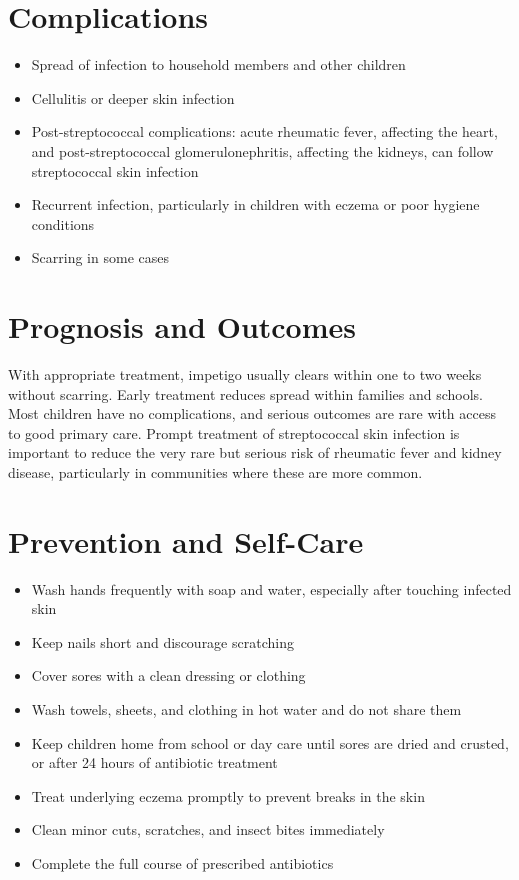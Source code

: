 \section*{Complications}
\begin{itemize}
    \item Spread of infection to household members and other children
    \item Cellulitis or deeper skin infection
    \item Post-streptococcal complications: acute rheumatic fever, affecting the heart, and post-streptococcal glomerulonephritis, affecting the kidneys, can follow streptococcal skin infection
    \item Recurrent infection, particularly in children with eczema or poor hygiene conditions
    \item Scarring in some cases
\end{itemize}

\section*{Prognosis and Outcomes}
With appropriate treatment, impetigo usually clears within one to two weeks without scarring. Early treatment reduces spread within families and schools. Most children have no complications, and serious outcomes are rare with access to good primary care. Prompt treatment of streptococcal skin infection is important to reduce the very rare but serious risk of rheumatic fever and kidney disease, particularly in communities where these are more common.

\section*{Prevention and Self-Care}
\begin{itemize}
    \item Wash hands frequently with soap and water, especially after touching infected skin
    \item Keep nails short and discourage scratching
    \item Cover sores with a clean dressing or clothing
    \item Wash towels, sheets, and clothing in hot water and do not share them
    \item Keep children home from school or day care until sores are dried and crusted, or after 24 hours of antibiotic treatment
    \item Treat underlying eczema promptly to prevent breaks in the skin
    \item Clean minor cuts, scratches, and insect bites immediately
    \item Complete the full course of prescribed antibiotics
\end{itemize}

